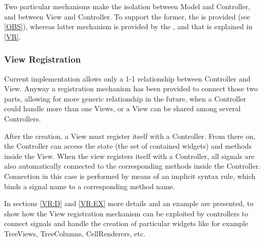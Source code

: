 Two particular mechanisms make the isolation between Model and
Controller, and between View and Controller. To support the former,
the \obs is provided (see \ref{OBS}), whereas latter mechanism is
provided by the \mvc, and that is explained in \ref{VR}.


\subsubsection{\label{VR} View Registration}
Current implementation allows only a 1-1 relationship between
Controller and View. Anyway a registration mechanism has been provided
to connect those two parts, allowing for more generic relationship in
the future, when a Controller could handle more than one Views, or a
View can be shared among several Controllers.

After the creation, a View must register itself with a Controller.
From there on, the Controller can access the state (the set of
contained widgets) and methods inside the View. When the view
registers itself with a Controller, all signals are also automatically
connected to the corresponding methods inside the Controller.
Connection in this case is performed by means of an implicit syntax
rule, which binds a signal name to a corresponding method name.

In sections \ref{VR:D} and \ref{VR:EX} more details and an example are
presented, to show how the View registration mechanism can be
exploited by controllers to connect signals and handle the creation of
particular widgets like for example TreeViews, TreeColumns,
CellRenderers, etc.
